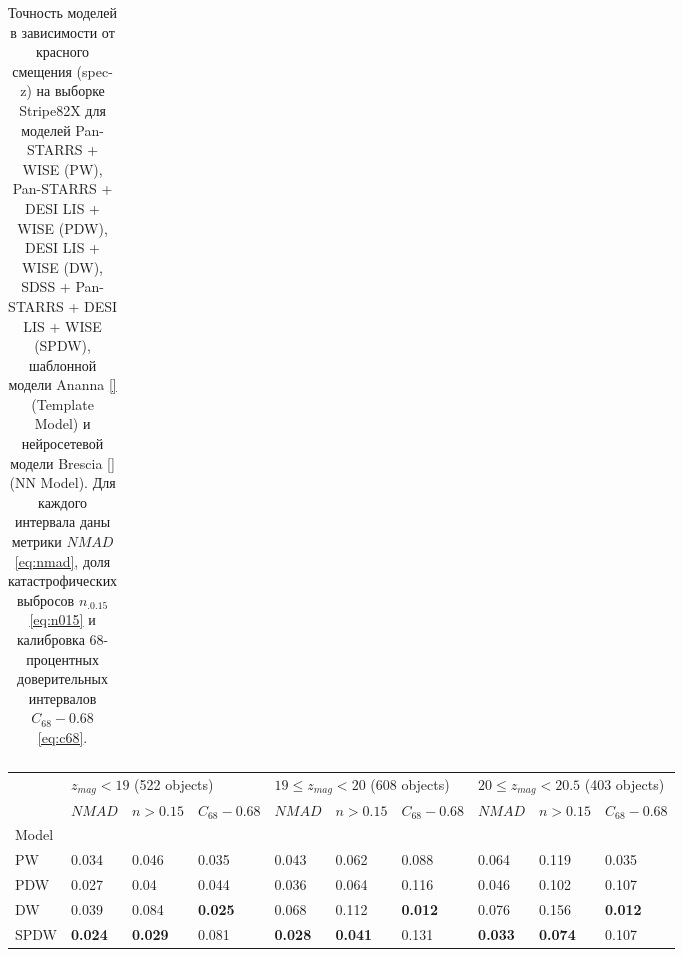 \documentclass[fleqn,usenatbib]{mnras}
\begin{document}
\begin{table}
\begin{tabular}{llllllllll}
            \hline
            \end{tabular}
            \caption{Точность моделей в зависимости от красного смещения (spec-z) на выборке Stripe82X для моделей Pan-STARRS + WISE (PW), Pan-STARRS + DESI LIS + WISE (PDW), DESI LIS + WISE (DW), SDSS + Pan-STARRS + DESI LIS + WISE (SPDW), шаблонной модели Ananna \ref{} (Template Model) и нейросетевой модели Brescia \ref{} (NN Model). Для каждого интервала даны метрики $NMAD$ \eqref{eq:nmad}, доля катастрофических выбросов $n_{.0.15}$ \eqref{eq:n015} и калибровка 68-процентных доверительных интервалов $C_{68} - 0.68$ \eqref{eq:c68}.}
\end{table}




\begin{table}
	\begin{tabular}{llllllllll}
            \hline
            {} & \multicolumn{3}{l}{$z_{mag} < 19$ (522 objects)} & \multicolumn{3}{l}{$19 \leq z_{mag} < 20$ (608 objects)} & \multicolumn{3}{l}{$20 \leq z_{mag} < 20.5$ (403 objects)} \\
            {} &                       $NMAD$ &        $n>0.15$ & $C_{68} - 0.68$ &                               $NMAD$ &        $n>0.15$ & $C_{68} - 0.68$ &                                 $NMAD$ &        $n>0.15$ & $C_{68} - 0.68$ \\
            Model          &                              &                 &                 &                                      &                 &                 &                                        &                 &                 \\
            \hline
            PW             &                        0.034 &           0.046 &           0.035 &                                0.043 &           0.062 &           0.088 &                                  0.064 &           0.119 &           0.035 \\
            PDW            &                        0.027 &            0.04 &           0.044 &                                0.036 &           0.064 &           0.116 &                                  0.046 &           0.102 &           0.107 \\
            DW             &                        0.039 &           0.084 &  \textbf{0.025} &                                0.068 &           0.112 &  \textbf{0.012} &                                  0.076 &           0.156 &  \textbf{0.012} \\
            SPDW           &               \textbf{0.024} &  \textbf{0.029} &           0.081 &                       \textbf{0.028} &  \textbf{0.041} &           0.131 &                         \textbf{0.033} &  \textbf{0.074} &           0.107 \\

\end{tabular}
\end{table}
\end{document}
